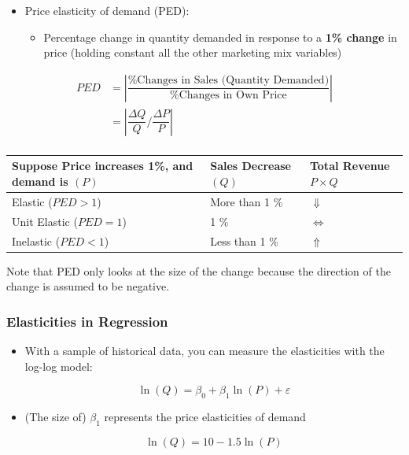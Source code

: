 \documentclass[10pt,article]{article}
\begin{document}
\begin{itemize}
\item Price elasticity of demand (PED): 
\begin{itemize}
\item Percentage change in quantity demanded in response to a \textbf{1\% change} in
price (holding constant all the other marketing mix variables)
\end{itemize}
\end{itemize}

\begin{align*}
   PED & = \left\lvert \dfrac{\% \text{Changes in Sales (Quantity Demanded)}}{\% \text{Changes in Own Price}} \right\rvert \\
       & = \left\lvert \dfrac {\Delta Q}{Q} \Bigg/ \dfrac {\Delta P}{P} \right\rvert   \\
\end{align*}

\begin{center}
\begin{tabular}{lll}
Suppose Price increases 1\%, and demand is \((P)\) & Sales Decrease \((Q)\) & Total Revenue \(P \times Q\)\\
\hline
 Elastic (\( PED > 1 \)) &  More than 1 \% &  \( \Downarrow \)\\
 Unit Elastic (\( PED = 1 \)) &  1 \% &  \( \Longleftrightarrow \)\\
 Inelastic (\( PED < 1 \)) &  Less than 1 \% &  \( \Uparrow \)\\
\end{tabular}
\end{center}

\begin{mdframed}[frametitle={Note}]
Note that PED only looks at the size of the change because the direction of
the change is assumed to be negative.
\end{mdframed}

\subsubsection{Elasticities in Regression}
\label{sec:org8481c19}
\begin{itemize}
\item With a sample of historical data, you can measure the elasticities with the
log-log model:

\[ \ln(Q) = \beta_0 + \beta_1 \ln(P) + \varepsilon \]

\item (The size of) \(\beta_1\) represents the price elasticities of demand

\[ \ln(Q) = 10 -1.5 \ln(P) \]
\end{itemize}
\end{document}

